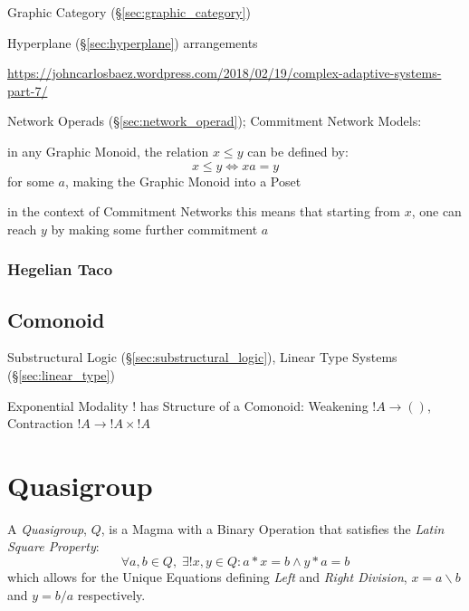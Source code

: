 
Graphic Category (\S\ref{sec:graphic_category})

Hyperplane (\S\ref{sec:hyperplane}) arrangements

\url{https://johncarlosbaez.wordpress.com/2018/02/19/complex-adaptive-systems-part-7/}

Network Operads (\S\ref{sec:network_operad}); Commitment Network Models:

in any Graphic Monoid, the relation $x \leq y$ can be defined by:
\[
  x \leq y \Leftrightarrow x a = y
\]
for some $a$, making the Graphic Monoid into a Poset

in the context of Commitment Networks this means that starting from $x$, one
can reach $y$ by making some further commitment $a$



\subsubsection{Hegelian Taco}\label{sec:hegelian_taco}



\subsection{Comonoid}\label{sec:comonoid}

Substructural Logic (\S\ref{sec:substructural_logic}), Linear Type
Systems (\S\ref{sec:linear_type})

Exponential Modality $!$ has Structure of a Comonoid: Weakening $!A
\rightarrow ()$, Contraction $!A \rightarrow !A \times !A$



\section{Quasigroup}\label{sec:quasigroup}

A \emph{Quasigroup}, $Q$, is a Magma with a Binary Operation that satisfies
the \emph{Latin Square Property}:
\[
  \forall a, b \in Q,\;\exists ! x,y \in Q : a * x = b \wedge y * a = b
\]
which allows for the Unique Equations defining \emph{Left} and
\emph{Right Division}, $x = a \backslash b$ and $y = b / a$
respectively.



